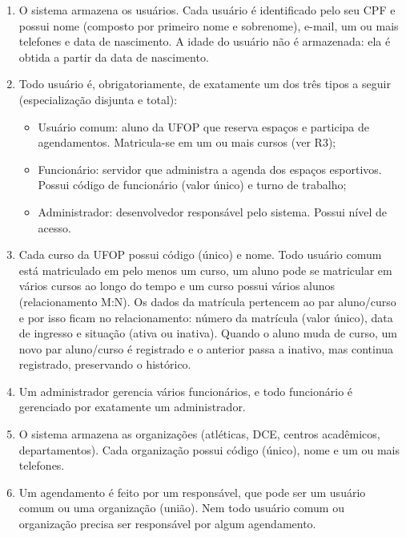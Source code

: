 \documentclass[11pt,a4paper]{article}
\begin{document}
\begin{enumerate}[label=R\arabic*., leftmargin=*, series=req]
  \item O sistema armazena os usuários. Cada usuário é identificado
        pelo seu CPF e possui nome (composto por primeiro nome e sobrenome),
        e-mail, um ou mais telefones e data de nascimento. A idade do usuário
        não é armazenada: ela é obtida a partir da data de nascimento.
  \item Todo usuário é, obrigatoriamente, de exatamente um dos três
        tipos a seguir (especialização disjunta e total):
        \begin{itemize}
          \item Usuário comum: aluno da UFOP que reserva espaços e
                participa de agendamentos. Matricula-se em um ou mais
                cursos (ver R3);
          \item Funcionário: servidor que administra a agenda dos
                espaços esportivos. Possui código de funcionário (valor
                único) e turno de trabalho;
          \item Administrador: desenvolvedor responsável pelo sistema.
                Possui nível de acesso.
        \end{itemize}
  \item Cada curso da UFOP possui código (único) e nome. Todo usuário comum
        está matriculado em pelo menos um curso, um aluno pode se matricular
        em vários cursos ao longo do tempo e um curso possui vários alunos
        (relacionamento M:N). Os dados da matrícula pertencem ao par
        aluno/curso e por isso ficam no relacionamento: número da matrícula
        (valor único), data de ingresso e situação (ativa ou inativa). Quando o
        aluno muda de curso, um novo par aluno/curso é registrado e o anterior
        passa a inativo, mas continua registrado, preservando o histórico.
  \item Um administrador gerencia vários funcionários, e todo funcionário é
        gerenciado por exatamente um administrador.
  \item O sistema armazena as organizações (atléticas, DCE, centros
        acadêmicos, departamentos). Cada organização possui código (único),
        nome e um ou mais telefones.
  \item Um agendamento é feito por um responsável, que pode ser um
        usuário comum ou uma organização (união). Nem todo usuário
        comum ou organização precisa ser responsável por algum agendamento.
\end{enumerate}
\end{document}
